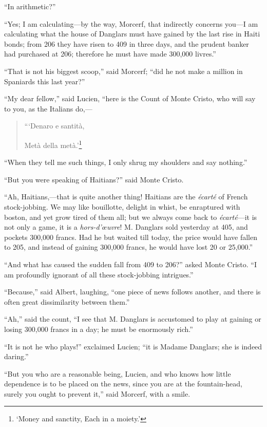“In arithmetic?”

“Yes; I am calculating—by the way, Morcerf, that indirectly concerns
you—I am calculating what the house of Danglars must have gained by the
last rise in Haiti bonds; from 206 they have risen to 409 in three
days, and the prudent banker had purchased at 206; therefore he must
have made 300,000 livres.”

“That is not his biggest scoop,” said Morcerf; “did he not make a
million in Spaniards this last year?”

“My dear fellow,” said Lucien, “here is the Count of Monte Cristo, who
will say to you, as the Italians do,—

\begin{quote}
{\small “‘Denaro e santità,

Metà della metà.’\footnote[9]{‘Money and sanctity, Each in a moiety.’}}
\end{quote}


“When they tell me such things, I only shrug my shoulders and say
nothing.”

“But you were speaking of Haitians?” said Monte Cristo.

“Ah, Haitians,—that is quite another thing! Haitians are the \textit{écarté}
of French stock-jobbing. We may like bouillotte, delight in whist, be
enraptured with boston, and yet grow tired of them all; but we always
come back to \textit{écarté}—it is not only a game, it is a \textit{hors-d’œuvre}! M.
Danglars sold yesterday at 405, and pockets 300,000 francs. Had he but
waited till today, the price would have fallen to 205, and instead of
gaining 300,000 francs, he would have lost 20 or 25,000.”

“And what has caused the sudden fall from 409 to 206?” asked Monte
Cristo. “I am profoundly ignorant of all these stock-jobbing
intrigues.”

“Because,” said Albert, laughing, “one piece of news follows another,
and there is often great dissimilarity between them.”

“Ah,” said the count, “I see that M. Danglars is accustomed to play at
gaining or losing 300,000 francs in a day; he must be enormously rich.”

“It is not he who plays!” exclaimed Lucien; “it is Madame Danglars; she
is indeed daring.”

“But you who are a reasonable being, Lucien, and who knows how little
dependence is to be placed on the news, since you are at the
fountain-head, surely you ought to prevent it,” said Morcerf, with a
smile.

